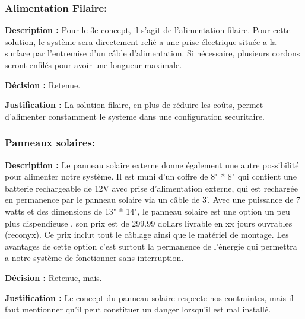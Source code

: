 \subsubsection{Alimentation Filaire:}
\textbf{Description :}
Pour le 3e concept, il s'agit de l'alimentation filaire. Pour cette solution, le système sera directement relié a une prise électrique située a la surface par l'entremise d'un câble d'alimentation. Si nécessaire, plusieurs cordons seront enfilés pour avoir une longueur maximale.
 
 \textbf{Décision :}
 Retenue.
 
 \textbf{Justification :}
 La solution filaire, en plus de réduire les coûts, permet d'alimenter constamment le systeme dans une configuration securitaire.
\subsubsection{Panneaux solaires:}

\textbf{Description :}
Le panneau solaire externe donne également une autre possibilité pour alimenter notre système. Il est muni d'un coffre de 8" * 8" qui contient une batterie rechargeable de 12V avec prise d'alimentation externe, qui est rechargée en permanence par le panneau solaire via un câble de 3'. Avec une puissance de 7 watts et des dimensions de 13" * 14", le panneau solaire est une option un peu plus dispendieuse , son prix est de 299.99 dollars livrable en xx jours ouvrables (reconyx). Ce prix inclut tout le câblage ainsi que le matériel de montage. Les avantages de cette option c'est surtout la permanence de l'énergie qui permettra a notre système de fonctionner sans interruption.

\textbf{Décision :}
Retenue, mais.

\textbf{Justification :}
Le concept du panneau solaire respecte nos contraintes, mais il faut mentionner qu'il peut constituer un danger lorsqu'il est mal installé.



\begin{table}[!htb]
\footnotesize
\centering
{}
\caption{Évaluation globale des concepts pour l'alimentation du système}
\label{t:Decision_alimenter}
\end{table}

